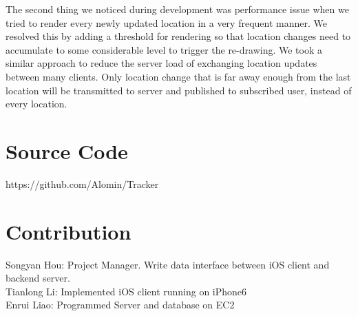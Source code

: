 \documentclass[journal]{IEEEtran}
\begin{document}
The second thing we noticed during development was performance issue when we tried to render every newly updated location in a very frequent manner. We resolved this by adding a threshold for rendering so that location changes need to accumulate to some considerable level to trigger the re-drawing. We took a similar approach to reduce the server load of exchanging location updates between many clients. Only location change that is far away enough from the last location will be transmitted to server and published to subscribed user, instead of every location.












\ifCLASSOPTIONcaptionsoff
  \newpage
\fi

\appendices
\section{Source Code}
https://github.com/Alomin/Tracker
\section{Contribution}

Songyan Hou: Project Manager. Write data interface between iOS client and backend server. \\

Tianlong Li: Implemented iOS client running on iPhone6\\

Enrui Liao: Programmed Server and database on EC2 \\
\end{document}
